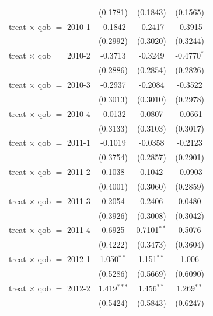 \begin{table}[H]
\begin{tabular}{lccc}
                                     & (0.1781)      & (0.1843)       & (0.1565)\\   
      treat $\times$ qob $=$ 2010-1  & -0.1842       & -0.2417        & -0.3915\\   
                                     & (0.2992)      & (0.3020)       & (0.3244)\\   
      treat $\times$ qob $=$ 2010-2  & -0.3713       & -0.3249        & -0.4770$^{*}$\\   
                                     & (0.2886)      & (0.2854)       & (0.2826)\\   
      treat $\times$ qob $=$ 2010-3  & -0.2937       & -0.2084        & -0.3522\\   
                                     & (0.3013)      & (0.3010)       & (0.2978)\\   
      treat $\times$ qob $=$ 2010-4  & -0.0132       & 0.0807         & -0.0661\\   
                                     & (0.3133)      & (0.3103)       & (0.3017)\\   
      treat $\times$ qob $=$ 2011-1  & -0.1019       & -0.0358        & -0.2123\\   
                                     & (0.3754)      & (0.2857)       & (0.2901)\\   
      treat $\times$ qob $=$ 2011-2  & 0.1038        & 0.1042         & -0.0903\\   
                                     & (0.4001)      & (0.3060)       & (0.2859)\\   
      treat $\times$ qob $=$ 2011-3  & 0.2054        & 0.2406         & 0.0480\\   
                                     & (0.3926)      & (0.3008)       & (0.3042)\\   
      treat $\times$ qob $=$ 2011-4  & 0.6925        & 0.7101$^{**}$  & 0.5076\\   
                                     & (0.4222)      & (0.3473)       & (0.3604)\\   
      treat $\times$ qob $=$ 2012-1  & 1.050$^{**}$  & 1.151$^{**}$   & 1.006\\   
                                     & (0.5286)      & (0.5669)       & (0.6090)\\   
      treat $\times$ qob $=$ 2012-2  & 1.419$^{***}$ & 1.456$^{**}$   & 1.269$^{**}$\\   
                                     & (0.5424)      & (0.5843)       & (0.6247)\\   

\end{tabular}
\end{table}
